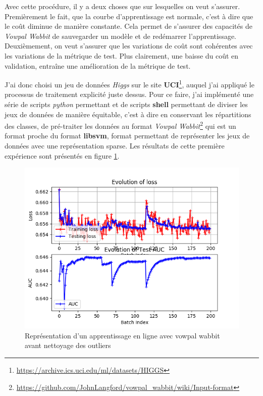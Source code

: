         Avec cette procédure, il y a deux choses que sur lesquelles on veut s'assurer. Premièrement le fait, que la courbe d'apprentissage est normale, c'est à dire que le coût diminue de manière constante. Cela permet de s'assurer des capacités de \emph{Vowpal Wabbit} de sauvegarder un modèle et de redémarrer l'apprentissage. Deuxièmement, on veut s'assurer que les variations de coût sont cohérentes avec les variations de la métrique de test. Plus clairement, une baisse du coût en validation, entraîne une amélioration de la métrique de test. \par
        J'ai donc choisi un jeu de données \emph{Higgs} sur le site \textbf{UCI}\footnote{\url{https://archive.ics.uci.edu/ml/datasets/HIGGS}}, auquel j'ai appliqué le processus de traitement explicité juste dessus. Pour ce faire, j'ai implémenté une série de scripts \emph{python} permettant et de scripts \textbf{shell} permettant de diviser les jeux de données de manière équitable, c'est à dire en conservant les répartitions des classes, de pré-traiter les données au format \emph{Vowpal Wabbit}\footnote{\url{https://github.com/JohnLangford/vowpal_wabbit/wiki/Input-format}} qui est un format proche du format \textbf{libsvm}, format permettant de représenter les jeux de données avec une représentation sparse. Les résultats de cette première expérience sont présentés en figure \ref{fig:exp_outliers_first}. 
        \begin{figure}[h]
            \label{fig:exp_outliers_first}
            \centering
            \includegraphics[scale=0.75]{images/experiment_outliers_first.png}
            \caption{Représentation d'un apprentissage en ligne avec vowpal wabbit avant nettoyage des outliers}
        \end{figure}

